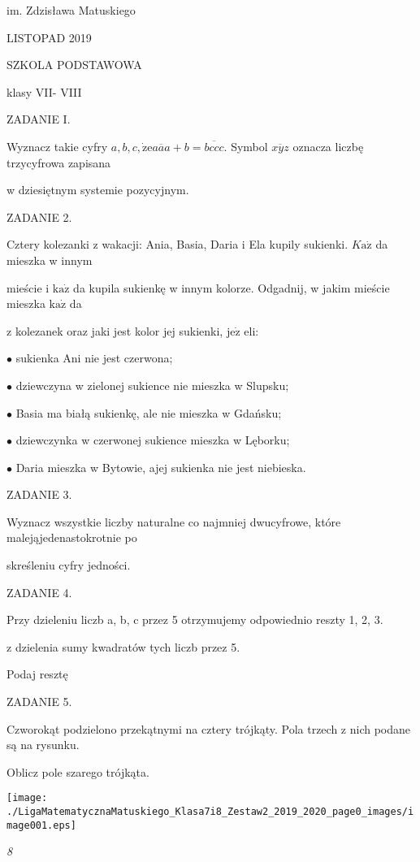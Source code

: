 \documentclass[a4paper,12pt]{article}
\begin{document}
im. Zdzisława Matuskiego

LISTOPAD 2019

SZKOLA PODSTAWOWA

klasy VII- VIII

ZADANIE I.

Wyznacz takie cyfry $a, b, c, \dot{\mathrm{z}}\mathrm{e}\overline{aaa}+b=\overline{bccc}$. Symbol $\overline{xyz}$ oznacza liczbę trzycyfrowa zapisana

w dziesiętnym systemie pozycyjnym.

ZADANIE 2.

Cztery kolezanki z wakacji: Ania, Basia, Daria i Ela kupily sukienki. $K\mathrm{a}\dot{\mathrm{z}}$ da mieszka w innym

mieście i $\mathrm{k}\mathrm{a}\dot{\mathrm{z}}$ da kupila sukienkę w innym kolorze. Odgadnij, w jakim mieście mieszka $\mathrm{k}\mathrm{a}\dot{\mathrm{z}}$ da

z kolezanek oraz jaki jest kolor jej sukienki, $\mathrm{j}\mathrm{e}\dot{\mathrm{z}}$ eli:

$\bullet$ sukienka Ani nie jest czerwona;

$\bullet$ dziewczyna w zielonej sukience nie mieszka w Slupsku;

$\bullet$ Basia ma białą sukienkę, ale nie mieszka w Gdańsku;

$\bullet$ dziewczynka w czerwonej sukience mieszka w Lęborku;

$\bullet$ Daria mieszka w Bytowie, ajej sukienka nie jest niebieska.

ZADANIE 3.

Wyznacz wszystkie liczby naturalne co najmniej dwucyfrowe, które malejąjedenastokrotnie po

skreśleniu cyfry jedności.

ZADANIE 4.

Przy dzieleniu liczb a, b, c przez 5 otrzymujemy odpowiednio reszty 1, 2, 3.

z dzielenia sumy kwadratów tych liczb przez 5.

Podaj resztę

ZADANIE 5.

Czworokąt podzielono przekątnymi na cztery trójkąty. Pola trzech z nich podane są na rysunku.

Oblicz pole szarego trójkąta.
\begin{center}
\texttt{[image: ./LigaMatematycznaMatuskiego\_Klasa7i8\_Zestaw2\_2019\_2020\_page0\_images/image001.eps]}
\end{center}
{\it 8}
\end{document}
